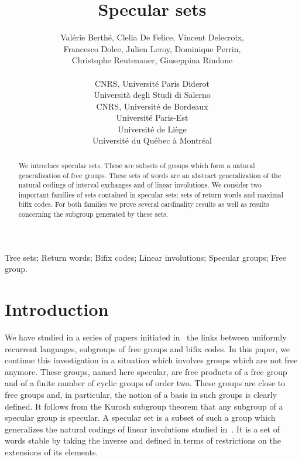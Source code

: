 \documentclass[preprint,12pt]{elsarticle}
\numberwithin{theorem}{section}
\numberwithin{equation}{section}
\numberwithin{figure}{section}
\numberwithin{table}{section}
\begin{document}
\begin{frontmatter}

\title{Specular sets}

\author{Val\'erie Berth\'e, Clelia De Felice, Vincent Delecroix, \\ Francesco Dolce, Julien Leroy, Dominique Perrin, \\ Christophe Reutenauer, Giuseppina Rindone \\ \\  CNRS, Universit\'e Paris Diderot \\  Universit\`a degli Studi di Salerno \\  CNRS, Universit\'e de Bordeaux \\  Universit\'e Paris-Est \\  Universit\'e de Li\`ege \\  Universit\'e du Qu\'ebec \`a Montr\'eal}

\begin{abstract}
We introduce specular sets.
These are subsets of groups which form a natural generalization of free groups.
These sets of words are an abstract generalization of the natural codings of interval exchanges and of linear involutions.
We consider two important families of sets contained in specular sets: sets of return words and maximal bifix codes.
For both families we prove several cardinality results as well as results concerning the subgroup generated by these sets.
\end{abstract}

\begin{keyword}
Tree sets; Return words; Bifix codes; Linear involutions; Specular groups; Free group.
\end{keyword}


\end{frontmatter}







\tableofcontents





\section{Introduction}

We have studied in a series of papers initiated in~\cite{BerstelDeFelicePerrinReutenauerRindone2012} the links between uniformly recurrent languages, subgroups of free groups and bifix codes.
In this paper, we continue this investigation in a situation which involves groups which are not free anymore.
These groups, named here specular, are free products of a free group and of a finite number of cyclic groups of order two.
These groups are close to free groups and, in particular, the notion of a basis in such groups is clearly defined.
It follows from the Kurosh subgroup theorem that any subgroup of a specular group is specular.
A specular set is a subset of such a group which generalizes the natural codings of linear involutions studied in~\cite{BertheDelecroixDolcePerrinReutenauerRindone2014}.
It is a set of words stable by taking the inverse and defined in terms of restrictions on the extensions of its elements.
\end{document}
